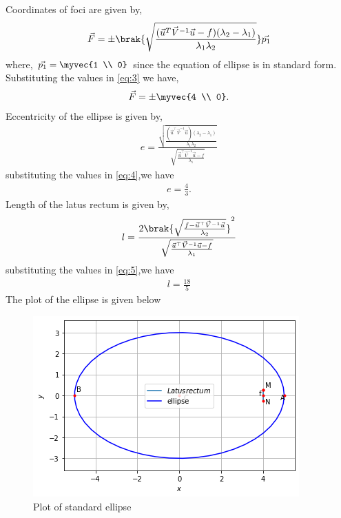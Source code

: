 \documentclass[journal,12pt,twocolumn]{IEEEtran}
\begin{document}
Coordinates of foci are given by,
\begin{align}
  \vec{F} =\pm\brak{\sqrt{\frac{(\vec{u}^T\vec{V}^{-1}\vec{u}-f)(\lambda_2-\lambda_1)}{\lambda_1\lambda_2}}}\vec{p_1} \label{eq:3}
\end{align}
where, $\vec{p_1} = \myvec{1 \\ 0}$ since the equation of ellipse is in standard form.
Substituting the values in \eqref{eq:3} we have,
\begin{align}
    \vec{F} = \pm\myvec{4 \\ 0}.
\end{align}
Eccentricity of the ellipse is given by,
\begin{align}
   e = \frac{\sqrt{\frac{(\vec{u}^{\top}\vec{V}^{-1}\vec{u})(\lambda_2-\lambda_1)}{\lambda_1\lambda_2}}}{\sqrt{\frac{\vec{u}^{\top}\vec{V}^{-1}\vec{u}-f}{\lambda_1}}} \label{eq:4}
\end{align}
substituting the values in \eqref{eq:4},we have
\begin{align}
   e = \frac{4}{3}.
\end{align}
Length of the latus rectum is given by,
\begin{align}
    l = \frac{2\brak{{\sqrt{\frac{f-\vec{u}^{\top}\vec{V}^{-1}\vec{u}}{\lambda_2}}}}^2}{\sqrt{\frac{\vec{u}^{\top}\vec{V}^{-1}\vec{u}-f}{\lambda_1}}} \label{eq:5}
\end{align}
substituting the values in \eqref{eq:5},we have
\begin{align}
   l = \frac{18}{5}
\end{align}
The plot of the ellipse is given below
\begin{figure}[ht]
\centering
\includegraphics[width=\columnwidth]{ellipse.PNG}
\caption{Plot of standard ellipse}
\label{Plot of standard ellipse}
\end{figure}
\end{document}
